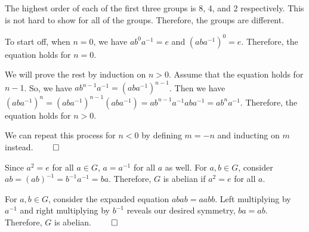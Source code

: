 \documentclass{report}
\begin{document}

The highest order of each of the first three groups is 8, 4, and 2 respectively. This is not hard to show for all of the groups. Therefore, the groups are different.

\sol To start off, when $n=0$, we have $ab^0a^{-1} = e$ and $(aba^{-1})^0 = e$. Therefore, the equation holds for $n=0$.

We will prove the rest by induction on $n > 0$. Assume that the equation holds for $n-1$. So, we have $ab^{n-1}a^{-1} = (aba^{-1})^{n-1}$. Then we have $(aba^{-1})^{n} = (aba^{-1})^{n-1} (aba^{-1}) = ab^{n-1}a^{-1}aba^{-1} = ab^{n}a^{-1}$. Therefore, the equation holds for $n > 0$.

We can repeat this process for $n < 0$ by defining $m = -n$ and inducting on $m$ instead. $\qed$

\sol Since $a^2 = e$ for all $a \in G$, $a = a^{-1}$ for all $a$ as well. For $a,b \in G$, consider $ab = (ab)^{-1} = b^{-1}a^{-1} = ba$. Therefore, $G$ is abelian if $a^2 = e$ for all $a$.

\sol

\sol For $a,b \in G$, consider the expanded equation $abab = aabb$. Left multiplying by $a^{-1}$ and right multiplying by $b^{-1}$ reveals our desired symmetry, $ba = ab$. Therefore, $G$ is abelian. $\qed$
\end{document}
